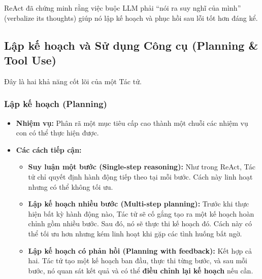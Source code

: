 ReAct đã chứng minh rằng việc buộc LLM phải “nói ra suy nghĩ của mình” (verbalize its thoughts) giúp nó lập kế hoạch và phục hồi sau lỗi tốt hơn đáng kể.

\subsection{Lập kế hoạch và Sử dụng Công cụ (Planning \& Tool Use)}
\label{ssec:planning_tool_use}
Đây là hai khả năng cốt lõi của một Tác tử.

\subsubsection{Lập kế hoạch (Planning)}
\begin{itemize}
    \item \textbf{Nhiệm vụ:} Phân rã một mục tiêu cấp cao thành một chuỗi các nhiệm vụ con có thể thực hiện được.
    \item \textbf{Các cách tiếp cận:}
        \begin{itemize}
            \item \textbf{Suy luận một bước (Single-step reasoning):} Như trong ReAct, Tác tử chỉ quyết định hành động tiếp theo tại mỗi bước. Cách này linh hoạt nhưng có thể không tối ưu.
            \item \textbf{Lập kế hoạch nhiều bước (Multi-step planning):} Trước khi thực hiện bất kỳ hành động nào, Tác tử sẽ cố gắng tạo ra một kế hoạch hoàn chỉnh gồm nhiều bước. Sau đó, nó sẽ thực thi kế hoạch đó. Cách này có thể tối ưu hơn nhưng kém linh hoạt khi gặp các tình huống bất ngờ.
            \item \textbf{Lập kế hoạch có phản hồi (Planning with feedback):} Kết hợp cả hai. Tác tử tạo một kế hoạch ban đầu, thực thi từng bước, và sau mỗi bước, nó quan sát kết quả và có thể \textbf{điều chỉnh lại kế hoạch} nếu cần.
        \end{itemize}
\end{itemize}

